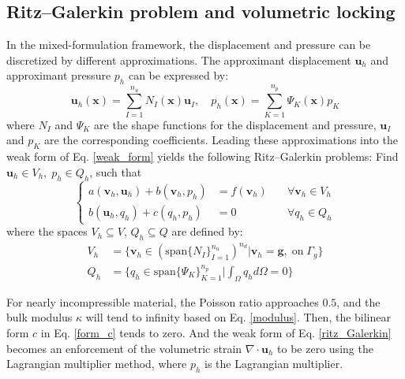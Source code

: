 \subsection{Ritz--Galerkin problem and volumetric locking}
In the mixed-formulation framework, the displacement and pressure can be discretized by different approximations. The approximant displacement $\boldsymbol{u}_h$ and approximant pressure $p_h$ can be expressed by:
\begin{equation}
\boldsymbol{u}_h(\boldsymbol{x}) = \sum_{I = 1}^{n_u} N_I(\boldsymbol{x}) \boldsymbol{u}_I, \quad
p_h(\boldsymbol{x}) = \sum_{K = 1}^{n_p} \Psi_K(\boldsymbol{x}) p_K
\end{equation}
where $N_I$ and $\Psi_K$ are the shape functions for the displacement and pressure, $\boldsymbol u_I$ and $p_K$ are the corresponding coefficients.
Leading these approximations into the weak form of Eq. \eqref{weak_form} yields the following Ritz--Galerkin problems:
Find $\boldsymbol{u}_h \in V_h, \; p_h \in Q_h$, such that
\begin{equation}\label{ritz_Galerkin}
\left\{
\begin{aligned}
a(\boldsymbol{v}_h, \boldsymbol{u}_h) + b(\boldsymbol{v}_h, p_h) &= f(\boldsymbol{v}_h) \quad &\forall \boldsymbol{v}_h \in V_h \\
b(\boldsymbol{u}_h, q_h) + c(q_h, p_h) &= 0 \quad &\forall q_h \in Q_h
\end{aligned}
\right.
\end{equation}
where the spaces $V_h \subseteq V$, $Q_h \subseteq Q$ are defined by:
\begin{align}
V_h &= \{\boldsymbol v_h \in (\mathrm{span}\{N_I\}_{I=1}^{n_u})^{n_d} \vert \boldsymbol v_h = \boldsymbol g,\; \mathrm{on} \; \Gamma_g\}
\\
Q_h &= \{q_h \in \mathrm{span}\{\Psi_K\}_{K=1}^{n_p} \vert \textstyle \int_{\Omega} q_h d\Omega = 0\}
\end{align}

For nearly incompressible material, the Poisson ratio approaches $0.5$, and the bulk modulus $\kappa$ will tend to infinity based on Eq. \eqref{modulus}. Then, the bilinear form $c$ in Eq. \eqref{form_c} tends to zero. And the weak form of Eq. \eqref{ritz_Galerkin} becomes an enforcement of the volumetric strain $\nabla \cdot \boldsymbol{u}_h$ to be zero using the Lagrangian multiplier method, where $p_h$ is the Lagrangian multiplier.

